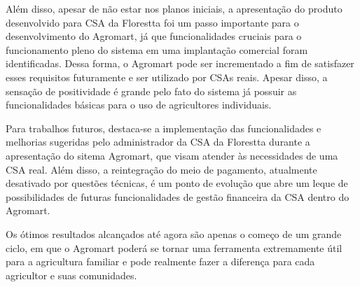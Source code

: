 Além disso, apesar de não estar nos planos iniciais, a apresentação do produto desenvolvido para CSA da Florestta foi um passo importante para o desenvolvimento do Agromart, já que funcionalidades cruciais para o funcionamento pleno do sistema em uma implantação comercial foram identificadas. Dessa forma, o Agromart pode ser incrementado a fim de satisfazer esses requisitos futuramente e ser utilizado por CSAs reais. Apesar disso, a sensação de positividade é grande pelo fato do sistema já possuir as funcionalidades básicas para o uso de agricultores individuais.

Para trabalhos futuros, destaca-se a implementação das funcionalidades e melhorias sugeridas pelo administrador da CSA da Florestta durante a apresentação do sitema Agromart, que visam atender às necessidades de uma CSA real. Além disso, a reintegração do meio de pagamento, atualmente desativado por questões técnicas, é um ponto de evolução que abre um leque de possibilidades de futuras funcionalidades de gestão financeira da CSA dentro do Agromart.

Os ótimos resultados alcançados até agora são apenas o começo de um grande ciclo, em que o Agromart poderá se tornar uma ferramenta extremamente útil para a agricultura familiar e pode realmente fazer a diferença para cada agricultor e suas comunidades.
